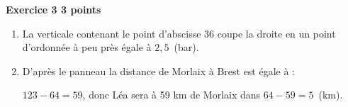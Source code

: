 \textbf{Exercice 3 \hfill 3 points}

\medskip

\begin{enumerate}
\item %

%
%
%
La verticale contenant le point d’abscisse 36 coupe la droite en un point d’ordonnée à peu près égale à $2,5$~(bar).
\item %

%
D’après le panneau la distance de Morlaix à Brest est égale à :

$123 - 64 = 59$, donc Léa sera à 59 km de Morlaix dans $64 - 59 = 5$~(km).
\end{enumerate}
 
\vspace{0,5cm}

